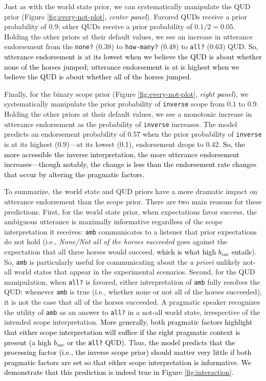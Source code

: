\documentclass[cm]{glossa}
\newcommand{\lp}[1]{\textcolor{black}{#1}} %
\begin{document}
Just as with the world state prior, we can systematically manipulate the QUD prior (Figure \ref{fig:every-not-plot}, \emph{center \lp{panel}}).  Favored QUDs receive a prior probability of $0.9$; other QUDs receive a prior probability of $0.1/2=0.05$. Holding the other priors at their default values, we see an increase in utterance endorsement from the \texttt{none?} (0.38) to \texttt{how-many?} (0.48) to \texttt{all?} (0.63) QUD. %
\lp{So, utterance endorsement is at its lowest when we believe the QUD is about whether none of the horses jumped; utterance endorsement is at is highest when we believe the QUD is about whether all of the horses jumped.}

Finally, for the binary scope prior (Figure \ref{fig:every-not-plot}, \emph{right \lp{panel}}), we systematically manipulate the prior probability of \texttt{inverse} scope from $0.1$ to $0.9$. Holding the other priors at their default values, we see a monotonic increase in utterance endorsement as the probability of \texttt{inverse} increases. The model predicts an endorsement probability of 0.57 when the prior probability of \texttt{inverse} is at its highest ($0.9$)---at its lowest (0.1), endorsement drops to 0.42.
\lp{So, the more accessible the inverse interpretation, the more utterance endorsement increases---though notably, the change is less than the endorsement rate changes that occur by altering the pragmatic factors.}

To summarize, the world state and QUD priors have a more dramatic impact on utterance endorsement than the scope prior.  There are two main reasons for these predictions. First, for the world state prior, when expectations favor success, the ambiguous utterance is maximally informative regardless of the scope interpretation it receives: \texttt{amb} communicates to a listener that prior  expectations do not hold (i.e., \textit{None/Not all of the horses succeeded} goes against the expectation that all three horses would succeed, \lp{which is what high $b_{suc}$ entails}). So, \texttt{amb} is particularly useful for communicating about the \emph{a priori} unlikely not-all world states that appear in the experimental scenarios. Second, for the QUD manipulation, when \texttt{all?} is favored, either interpretation of \texttt{amb} fully resolves the QUD: whenever \texttt{amb} is true (i.e., whether none or not all of the horses succeeded), it is not the case that all of the horses succeeded. A pragmatic speaker recognizes the utility of \texttt{amb} as an answer to \texttt{all?} in a not-all world state, irrespective of the intended scope interpretation.
\lp{More generally, both pragmatic factors highlight that either scope interpretation will suffice if the right pragmatic context is present (a high $b_{suc}$ or the \texttt{all?} QUD).}
Thus, \lp{the model predicts that the processing factor (i.e., the inverse scope prior) should matter very little if both pragmatic factors are set so that either scope interpretation is informative. We demonstrate that this prediction is indeed true in Figure \ref{fig:interaction}.}
\end{document}
